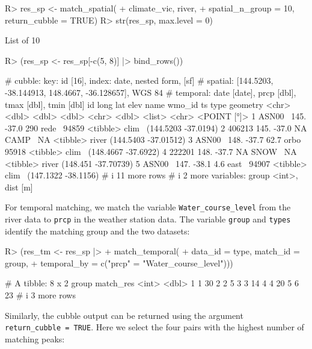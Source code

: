 \documentclass[
  shortnames]{jss}
\begin{document}
\begin{CodeChunk}
\begin{CodeInput}
R> res_sp <- match_spatial(
+   climate_vic, river, 
+   spatial_n_group = 10, return_cubble = TRUE)
R> str(res_sp, max.level = 0)
\end{CodeInput}
\begin{CodeOutput}
List of 10
\end{CodeOutput}
\begin{CodeInput}
R> (res_sp <- res_sp[-c(5, 8)] |> bind_rows())
\end{CodeInput}
\begin{CodeOutput}
# cubble:   key: id [16], index: date, nested form, [sf]
# spatial:  [144.5203, -38.144913, 148.4667, -36.128657], WGS 84
# temporal: date [date], prcp [dbl], tmax [dbl], tmin [dbl]
  id      long   lat  elev name  wmo_id ts       type              geometry
  <chr>  <dbl> <dbl> <dbl> <chr>  <dbl> <list>   <chr>          <POINT [°]>
1 ASN00~  145. -37.0 290   rede~  94859 <tibble> clim~  (144.5203 -37.0194)
2 406213  145. -37.0  NA   CAMP~     NA <tibble> river (144.5403 -37.01512)
3 ASN00~  148. -37.7  62.7 orbo~  95918 <tibble> clim~  (148.4667 -37.6922)
4 222201  148. -37.7  NA   SNOW~     NA <tibble> river  (148.451 -37.70739)
5 ASN00~  147. -38.1   4.6 east~  94907 <tibble> clim~  (147.1322 -38.1156)
# i 11 more rows
# i 2 more variables: group <int>, dist [m]
\end{CodeOutput}
\end{CodeChunk}

For temporal matching, we match the variable \texttt{Water\_course\_level} from the river data to \texttt{prcp} in the weather station data. The variable \texttt{group} and \texttt{types} identify the matching group and the two datasets:

\begin{CodeChunk}
\begin{CodeInput}
R> (res_tm <- res_sp |> 
+   match_temporal(
+     data_id = type, match_id = group,
+     temporal_by = c("prcp" = "Water_course_level")))
\end{CodeInput}
\begin{CodeOutput}
# A tibble: 8 x 2
  group match_res
  <int>     <dbl>
1     1        30
2     2         5
3     3        14
4     4        20
5     6        23
# i 3 more rows
\end{CodeOutput}
\end{CodeChunk}

Similarly, the cubble output can be returned using the argument \texttt{return\_cubble\ =\ TRUE}. Here we select the four pairs with the highest number of matching peaks:
\end{document}
